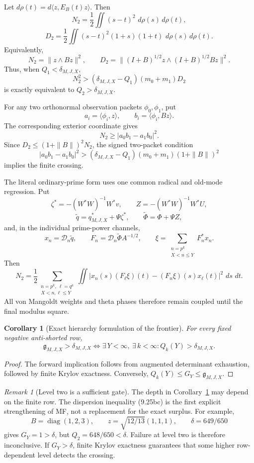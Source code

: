 \documentclass[11pt]{amsart}
\newtheorem{corollary}[theorem]{Corollary}
\theoremstyle{definition}
\theoremstyle{remark}
\newtheorem{remark}[theorem]{Remark}
\newcommand{\dd}{\,d}
\begin{document}
Let \(d\rho(t)=d\langle z,E_B(t)z\rangle\).  Then
\[
 \boxed{
 N_2=\frac12\iint(s-t)^2\,\dd\rho(s)\dd\rho(t),}
\]
\[
 \boxed{
 D_2=\frac12\iint
 (s-t)^2(1+s)(1+t)\,\dd\rho(s)\dd\rho(t).}
\tag{9.25ba}
\]
Equivalently,
\[
 N_2=\|z\wedge Bz\|^2,\qquad
 D_2=\|(I+B)^{1/2}z\wedge(I+B)^{1/2}Bz\|^2 .
\tag{9.25bb}
\]
Thus, when \(Q_1<\delta_{M,J,X}\),
\[
 \boxed{
 N_2^2>
 (\delta_{M,J,X}-Q_1)(m_0+m_1)D_2}
\tag{9.25bc}
\]
is exactly equivalent to \(Q_2>\delta_{M,J,X}\).

For any two orthonormal observation packets \(\phi_0,\phi_1\), put
\[
 a_i=\langle\phi_i,z\rangle,\qquad
 b_i=\langle\phi_i,Bz\rangle .
\]
The corresponding exterior coordinate gives
\[
 N_2\ge|a_0b_1-a_1b_0|^2.                       \tag{9.25bd}
\]
Since \(D_2\le(1+\|B\|)^2N_2\), the signed two-packet condition
\[
 \boxed{
 |a_0b_1-a_1b_0|^2>
 (\delta_{M,J,X}-Q_1)(m_0+m_1)(1+\|B\|)^2}
\tag{9.25be}
\]
implies the finite crossing.

The literal ordinary-prime form uses one common radical and old-mode
regression.  Put
\[
 \zeta^*=-(W^*W)^{-1}W^*v,\qquad
 Z=-(W^*W)^{-1} W^*U,
\]
\[
 \widetilde q=q_{M,J,X}^*+\Psi\zeta^*,\qquad
 \widetilde\Phi=\Phi+\Psi Z,
\]
and, in the individual prime-power channels,
\[
 x_n=\mathcal D_n\widetilde q,\qquad
 F_n=\mathcal D_n\widetilde\Phi A^{-1/2},\qquad
 \xi=\sum_{\substack{n=p^k\\X<n\le Y}}F_n^*x_n .
\tag{9.25bf}
\]
Then
\[
 \boxed{
 N_2=\frac12
 \sum_{\substack{n=p^k,\ \ell=q^a\\X<n,\ell\le Y}}\iint
 \left|x_n(s)(F_\ell\xi)(t)
 -(F_n\xi)(s)x_\ell(t)\right|^2\,\dd s\,\dd t.}
\tag{9.25bg}
\]
All von Mangoldt weights and theta phases therefore remain coupled until
the final modulus square.

\begin{corollary}[Exact hierarchy formulation of the frontier]
\label{cor:krylov-frontier}
For every fixed negative anti-shorted row,
\[
 \boxed{
 \mathfrak g_{M,J,X}>\delta_{M,J,X}
 \Longleftrightarrow
 \exists\,Y<\infty,\ \exists\,k<\infty:
 Q_k(Y)>\delta_{M,J,X}.}
\tag{9.25bh}
\]
\end{corollary}

\begin{proof}
The forward implication follows from augmented determinant exhaustion,
followed by finite Krylov exactness.  Conversely,
\(Q_k(Y)\le G_Y\le\mathfrak g_{M,J,X}\).
\end{proof}

\begin{remark}[Level two is a sufficient gate]
The depth in Corollary~\ref{cor:krylov-frontier} may depend on the finite
row.  The dispersion inequality (9.25bc) is the first explicit
strengthening of MF, not a replacement for the exact surplus.  For
example,
\[
 B=\operatorname{diag}(1,2,3),\qquad
 z=\sqrt{12/13}(1,1,1),\qquad
 \delta=649/650
\]
gives \(G_Y=1>\delta\), but \(Q_2=648/650<\delta\).  Failure at level
two is therefore inconclusive.  If \(G_Y>\delta\), finite Krylov
exactness guarantees that some higher row-dependent level detects the
crossing.
\end{remark}
\end{document}
